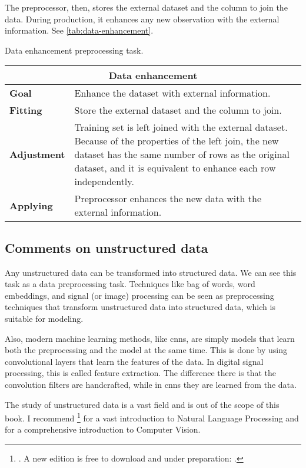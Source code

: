 The preprocessor, then, stores the external dataset and the column to join the data.
During production, it enhances any new observation with the external information.  See
\cref{tab:data-enhancement}.

\begin{tablebox}[label=tab:data-enhancement]{Data enhancement preprocessing task.}
  \centering
  \begin{tabular}{lp{6cm}}
    \toprule
    \multicolumn{2}{c}{\textbf{Data enhancement}} \\
    \midrule
    \textbf{Goal} &
      Enhance the dataset with external information. \\
    \textbf{Fitting} &
      Store the external dataset and the column to join. \\
    \textbf{Adjustment} &
      Training set is left joined with the external dataset.  Because of the properties of
      the left join, the new dataset has the same number of rows as the original dataset,
      and it is equivalent to enhance each row independently.  \\
    \textbf{Applying} &
      Preprocessor enhances the new data with the external information. \\
    \bottomrule
  \end{tabular}
\end{tablebox}

\subsection{Comments on unstructured data}

Any unstructured data can be transformed into structured data.  We can see this task as a
data preprocessing task.  Techniques like bag of words, word embeddings, and signal (or
image) processing can be seen as preprocessing techniques that transform unstructured data
into structured data, which is suitable for modeling.

Also, modern machine learning methods, like \glspl{cnn}, are simply models that learn both
the preprocessing and the model at the same time.  This is done by using convolutional
layers that learn the features of the data.  In digital signal processing, this is called
feature extraction.  The difference there is that the convolution filters are handcrafted,
while in \glspl{cnn} they are learned from the data.

The study of unstructured data is a vast field and is out of the scope of this book.  I
recommend \textcite{Jurafsky2008}\footnote{. A new edition is
free to download and under preparation: .} for a vast
introduction to Natural Language Processing and
\textcite{Szeliski2022} for a comprehensive introduction to
Computer Vision.

